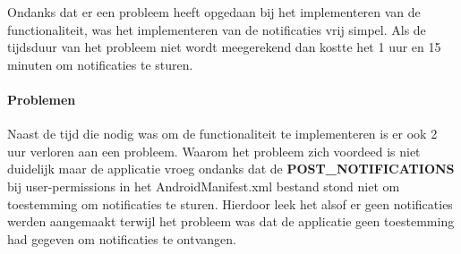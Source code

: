 Ondanks dat er een probleem heeft opgedaan bij het implementeren van de functionaliteit, was 
het implementeren van de notificaties vrij simpel. Als de tijdsduur van het probleem niet wordt meegerekend 
dan kostte het 1 uur en 15 minuten om notificaties te sturen.

\paragraph{Problemen}
Naast de tijd die nodig was om de functionaliteit te implementeren is er ook 2 uur verloren aan een probleem. 
Waarom het probleem zich voordeed is niet duidelijk maar de applicatie vroeg ondanks dat de 
\textbf{POST\_NOTIFICATIONS} bij user-permissions in het AndroidManifest.xml bestand stond 
niet om toestemming om notificaties te sturen. Hierdoor leek het alsof er geen notificaties werden aangemaakt
terwijl het probleem was dat de applicatie geen toestemming had gegeven om notificaties te ontvangen.